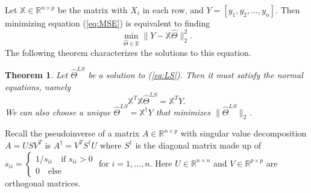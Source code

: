 \documentclass[11pt]{article}
\newtheorem{theorem}{Theorem}
\begin{document}
	Let $ \mathbb{X}\in \mathbb{R}^{n\times p} $ be the matrix with $ X_i $ in each row, and $ Y = [y_1,y_2,\ldots ,y_n] $. Then minimizing equation (\ref{eq:MSE}) is equivalent to finding 
	\begin{equation}\label{eq:LS}
		\min_{\hat \Theta\in \mathbb{R}} \| Y - \mathbb{X}\hat{\Theta} \|_2^2.
	\end{equation}
	The following theorem characterizes the solutions to this equation.
	
	\begin{theorem}\label{thm:lstsq}
		Let $ \hat \Theta^{LS} $ be a solution to (\ref{eq:LS}). Then it must satisfy the normal equations, namely
		\begin{equation}\label{eq:normal_eq}
			\mathbb{X}^T\mathbb{X} \hat \Theta^{LS} = \mathbb{X}^T Y.
		\end{equation}
		We can also choose a unique $ \hat \Theta^{LS} = \mathbb{X}^\dagger Y $ that minimizes $ \| \hat \Theta^{LS} \|_2 $.
	\end{theorem}

	Recall the pseudoinverse of a matrix $ A\in \mathbb{R}^{n\times p} $ with singular value decomposition $ A=USV^T $ is $ A^\dagger=V^TS^\dagger U $ where $ S^\dagger $ is the diagonal matrix made up of $ s_{ii} = \begin{cases}
		1/s_{ii}\quad \text{if }s_{ii}>0\\
		0\quad \text{else}
	\end{cases} $ for $ i=1,\ldots,n $. Here $ U\in \mathbb{R}^{n\times n} $ and $ V\in \mathbb{R}^{p\times p} $ are orthogonal matrices.
\end{document}
